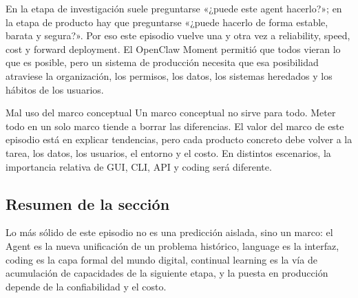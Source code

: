 En la etapa de investigación suele preguntarse «¿puede este agent hacerlo?»; en la etapa de producto hay que preguntarse «¿puede hacerlo de forma estable, barata y segura?». Por eso este episodio vuelve una y otra vez a reliability, speed, cost y forward deployment. El OpenClaw Moment permitió que todos vieran lo que es posible, pero un sistema de producción necesita que esa posibilidad atraviese la organización, los permisos, los datos, los sistemas heredados y los hábitos de los usuarios.

\begin{warningbox}{Mal uso del marco conceptual}
Un marco conceptual no sirve para todo. Meter todo en un solo marco tiende a borrar las diferencias. El valor del marco de este episodio está en explicar tendencias, pero cada producto concreto debe volver a la tarea, los datos, los usuarios, el entorno y el costo. En distintos escenarios, la importancia relativa de GUI, CLI, API y coding será diferente.
\end{warningbox}

\subsection{Resumen de la sección}

Lo más sólido de este episodio no es una predicción aislada, sino un marco: el Agent es la nueva unificación de un problema histórico, language es la interfaz, coding es la capa formal del mundo digital, continual learning es la vía de acumulación de capacidades de la siguiente etapa, y la puesta en producción depende de la confiabilidad y el costo.
